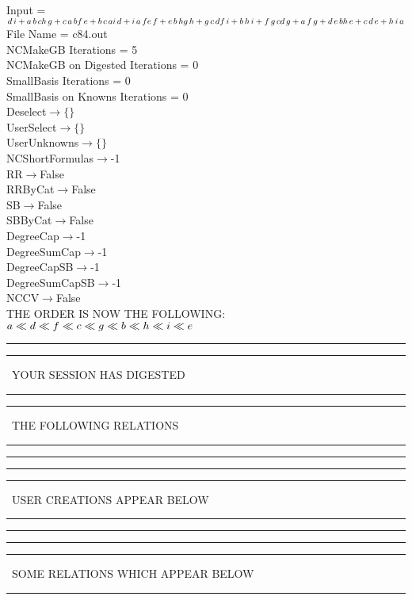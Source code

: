 \documentclass[rep10,leqno]{report}
\begin{document}
\normalsize
\baselineskip=12pt
\noindent
Input = 
$
\\d\,
 i + a\,
 b\,
 c\\
h\,
 g + c\,
 a\,
 b\\
f\,
 e + b\,
 c\,
 a\\
i\,
 d + i\,
 a\,
 f\\
e\,
 f + e\,
 b\,
 h\\
g\,
 h + g\,
 c\,
 d\\
f\,
 i + b\,
 h\,
 i + f\,
 g\,
 c\\
d\,
 g + a\,
 f\,
 g + d\,
 e\,
 b\\
h\,
 e + c\,
 d\,
 e + h\,
 i\,
 a\\
$
File Name = c84.out\\
NCMakeGB Iterations = 5\\
NCMakeGB on Digested Iterations = 0\\
SmallBasis Iterations = 0\\
SmallBasis on Knowns Iterations = 0\\
Deselect$\rightarrow \{\}$\\
UserSelect$\rightarrow \{\}$\\
UserUnknowns$\rightarrow \{\}$\\
NCShortFormulas$\rightarrow$-1\\
RR$\rightarrow $False\\
RRByCat$\rightarrow $False\\
SB$\rightarrow $False\\
SBByCat$\rightarrow $False\\
DegreeCap$\rightarrow $-1\\
DegreeSumCap$\rightarrow $-1\\
DegreeCapSB$\rightarrow $-1\\
DegreeSumCapSB$\rightarrow $-1\\
NCCV$\rightarrow $False\\
THE ORDER IS NOW THE FOLLOWING:\hfil\break
$
a\ll
d\ll
f\ll
c\ll
g\ll
b\ll
h\ll
i\ll
e\\
$
\rule[2pt]{6in}{4pt}\hfil\break
\rule[2pt]{1.879in}{4pt}
\ YOUR SESSION HAS DIGESTED\ 
\rule[2pt]{1.879in}{4pt}\hfil\break
\rule[2pt]{1.923in}{4pt}
\ THE FOLLOWING RELATIONS\ 
\rule[2pt]{1.923in}{4pt}\hfil\break
\rule[2pt]{6in}{4pt}\hfil\break
\rule[2pt]{6in}{1pt}\hfil\break
\rule[2.5pt]{1.701in}{1pt}
\ USER CREATIONS APPEAR BELOW\ 
\rule[2.5pt]{1.701in}{1pt}\hfil\break
\rule[2pt]{6in}{1pt}\hfil\break
\rule[2pt]{6in}{4pt}\hfil\break
\rule[2pt]{1.45in}{4pt}
\ SOME RELATIONS WHICH APPEAR BELOW\ 
\rule[2pt]{1.45in}{4pt}\hfil\break
\end{document}
